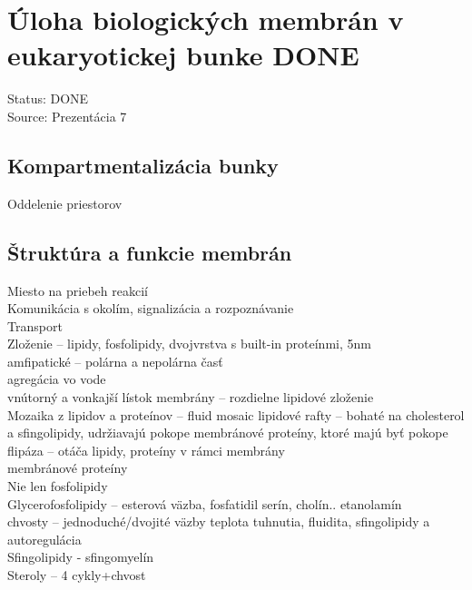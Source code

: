 \section{Úloha biologických membrán v eukaryotickej bunke DONE}

Status: DONE\\
Source: Prezentácia 7\\

\subsection{Kompartmentalizácia bunky}
Oddelenie priestorov\\
\subsection{Štruktúra a funkcie membrán}
Miesto na priebeh reakcií\\
Komunikácia s okolím, signalizácia a rozpoznávanie\\
Transport\\
Zloženie -- lipidy, fosfolipidy, dvojvrstva s built-in proteínmi, 5nm\\
amfipatické -- polárna a nepolárna časť\\
agregácia vo vode\\
vnútorný a vonkajší lístok membrány -- rozdielne lipidové zloženie\\
Mozaika z lipidov a proteínov -- fluid mosaic
lipidové rafty -- bohaté na cholesterol a sfingolipidy, udržiavajú pokope membránové proteíny, ktoré majú byť pokope\\
flipáza -- otáča lipidy, proteíny v rámci membrány\\
membránové proteíny\\

Nie len fosfolipidy\\
\tab Glycerofosfolipidy -- esterová väzba, fosfatidil serín, cholín.. etanolamín\\
\tab chvosty -- jednoduché/dvojité väzby \ra teplota tuhnutia, fluidita, sfingolipidy a autoregulácia\\
\tab Sfingolipidy - sfingomyelín\\
\tab Steroly -- 4 cykly+chvost\\
